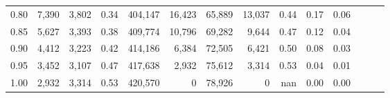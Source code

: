 \begin{tabular}{rrrrrrrrrrrrrr}
0.80 &   7,390 &  3,802 &  0.34 &  404,147 &   16,423 &  65,889 &  13,037 &  0.44 &  0.17 &      0.06 \\
0.85 &   5,627 &  3,393 &  0.38 &  409,774 &   10,796 &  69,282 &   9,644 &  0.47 &  0.12 &      0.04 \\
0.90 &   4,412 &  3,223 &  0.42 &  414,186 &    6,384 &  72,505 &   6,421 &  0.50 &  0.08 &      0.03 \\
0.95 &   3,452 &  3,107 &  0.47 &  417,638 &    2,932 &  75,612 &   3,314 &  0.53 &  0.04 &      0.01 \\
1.00 &   2,932 &  3,314 &  0.53 &  420,570 &        0 &  78,926 &       0 &   nan &  0.00 &      0.00 \\
\bottomrule
\end{tabular}
